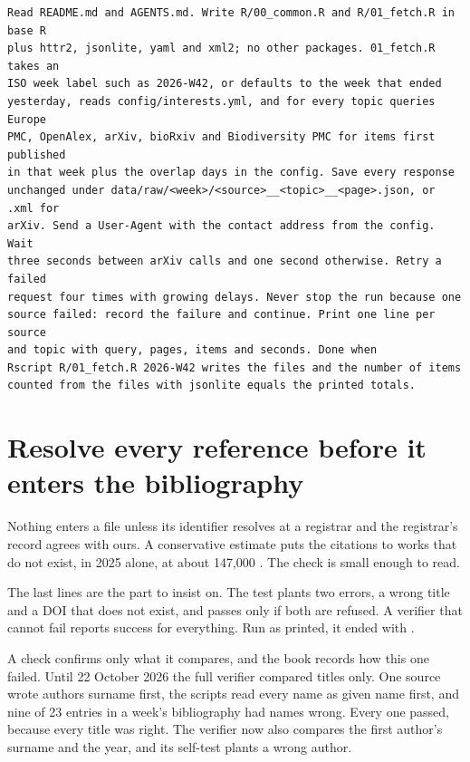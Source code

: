 \documentclass[11pt,a4paper]{article}
\begin{document}
\begin{lstlisting}[caption={The prompt for the fetch script}]
Read README.md and AGENTS.md. Write R/00_common.R and R/01_fetch.R in base R
plus httr2, jsonlite, yaml and xml2; no other packages. 01_fetch.R takes an
ISO week label such as 2026-W42, or defaults to the week that ended
yesterday, reads config/interests.yml, and for every topic queries Europe
PMC, OpenAlex, arXiv, bioRxiv and Biodiversity PMC for items first published
in that week plus the overlap days in the config. Save every response
unchanged under data/raw/<week>/<source>__<topic>__<page>.json, or .xml for
arXiv. Send a User-Agent with the contact address from the config. Wait
three seconds between arXiv calls and one second otherwise. Retry a failed
request four times with growing delays. Never stop the run because one
source failed: record the failure and continue. Print one line per source
and topic with query, pages, items and seconds. Done when
Rscript R/01_fetch.R 2026-W42 writes the files and the number of items
counted from the files with jsonlite equals the printed totals.
\end{lstlisting}

\section{Resolve every reference before it enters the bibliography}
\label{sec:resolve}

Nothing enters a  file unless its identifier resolves at a
registrar and the registrar's record agrees with ours. A conservative
estimate puts the citations to works that do not exist, in 2025 alone, at
about 147,000 \parencite{zhao2026citations}. The check is small enough to read.



The last lines are the part to insist on. The test plants two errors, a wrong
title and a DOI that does not exist, and passes only if both are refused. A
verifier that cannot fail reports success for everything. Run as printed, it
ended with .

A check confirms only what it compares, and the book records how this one
failed. Until 22 October 2026 the full verifier compared titles only. One
source wrote
authors surname first, the scripts read every name as given name first, and
nine of 23 entries in a week's bibliography had names wrong. Every one
passed, because every title was right. The verifier now also compares the
first author's surname and the year, and its self-test plants a wrong author.
\end{document}
